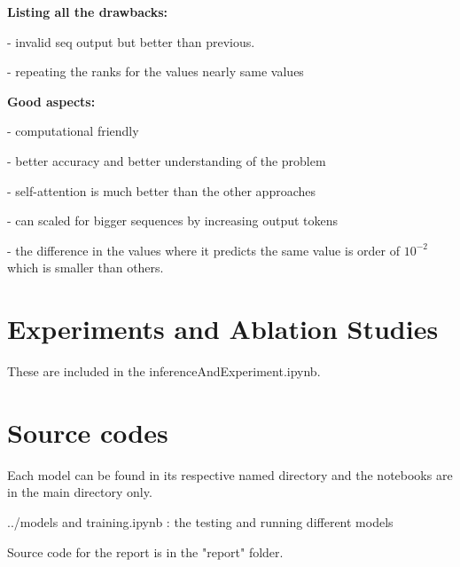 \documentclass[journal,12pt,onecolumn]{IEEEtran}
\begin{document}
\textbf{Listing all the drawbacks:}

- invalid seq output but better than previous.

- repeating the ranks for the values nearly same values

\textbf{Good aspects:}


- computational friendly

- better accuracy and better understanding of the problem 

- self-attention is much better than the other approaches

- can scaled for bigger sequences by increasing output tokens

- the difference in the values where it predicts the same value is order of $10^{-2}$ which is smaller than others.

\section{Experiments and Ablation Studies}

These are included in the inferenceAndExperiment.ipynb.

\section{Source codes}

Each model can be found in its respective named directory and the notebooks are in the main directory only.

../models and training.ipynb : the testing and running different models 

Source code for the report is in the "report" folder.
\end{document}
